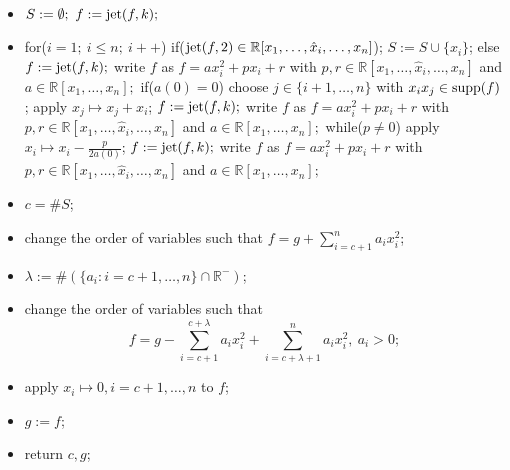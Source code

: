 \documentclass{amsproc}
\begin{document}
\begin{itemize}
\item $S:=\emptyset;\  f:=\textnormal{jet}(f,k);$
\item for($i=1;\ i\le n;\  i++$)\newline
\phantom{}\quad if($\textnormal{jet}(f,2)\in \mathbb R[x_1,\ldots,\hat x_i,\ldots,x_n]$);\newline
\phantom{}\quad\quad $S:=S\cup\{x_i\}$;\newline
\phantom{}\quad else\newline
\phantom{}\quad\quad $f:=\textnormal{jet}(f,k);$\newline
\phantom{}\quad\quad write $f$ as $f=ax_i^2+px_i+r$ with $p,r\in\mathbb R[x_1,\ldots,\hat x_i,\ldots,x_n]$\newline
\phantom{}\quad\quad and $a\in\mathbb R[x_1,\ldots,x_n];$\newline
\phantom{}\quad\quad if($a(0)=0$)\newline
\phantom{}\quad\quad\quad choose $j\in\{i+1,\ldots,n\}$ with $x_ix_j\in\textnormal{supp}(f)$;\newline
\phantom{}\quad\quad\quad apply $x_j\mapsto x_j+x_i$;\newline
\phantom{}\quad\quad\quad $f:=\textnormal{jet}(f,k);$\newline
\phantom{}\quad\quad\quad write $f$ as $f=ax_i^2+px_i+r$ with $p,r\in\mathbb R[x_1,\ldots,\hat x_i,\ldots,x_n]$\newline
\phantom{}\quad\quad\quad and $a\in\mathbb R[x_1,\ldots,x_n];$\newline
\phantom{}\quad\quad\quad\quad while($p\neq 0$)\newline
\phantom{}\quad\quad\quad\quad\quad apply $x_i\mapsto x_i-\frac{p}{2a(0)}$;\newline
\phantom{}\quad\quad\quad\quad\quad $f:=\textnormal{jet}(f,k);$\newline
\phantom{}\quad\quad\quad\quad\quad write $f$ as $f=ax_i^2+px_i+r$ with $p,r\in\mathbb R[x_1,\ldots,\hat x_i,\ldots,x_n]$\newline
\phantom{}\quad\quad\quad\quad\quad and $a\in\mathbb R[x_1,\ldots,x_n];$\newline
\item $c =\# S$; 
\item change the order of variables such that $\displaystyle f=g+\sum_{i=c+1}^na_ix_i^2$;
\item $\lambda:=\#(\{a_i:i=c+1,\ldots,n\}\cap\mathbb R^-)$;
\item change the order of variables such that \[f=g-\sum_{i=c+1}^{c+\lambda}a_ix_i^2+\sum_{i=c+\lambda+1}^na_ix_i^2,\  a_i>0;\]
\item apply $x_i\mapsto 0, i=c+1,\ldots,n$ to $f$;
\item $g:=f$;
\item return $c,g$;
\end{itemize}
\end{document}
